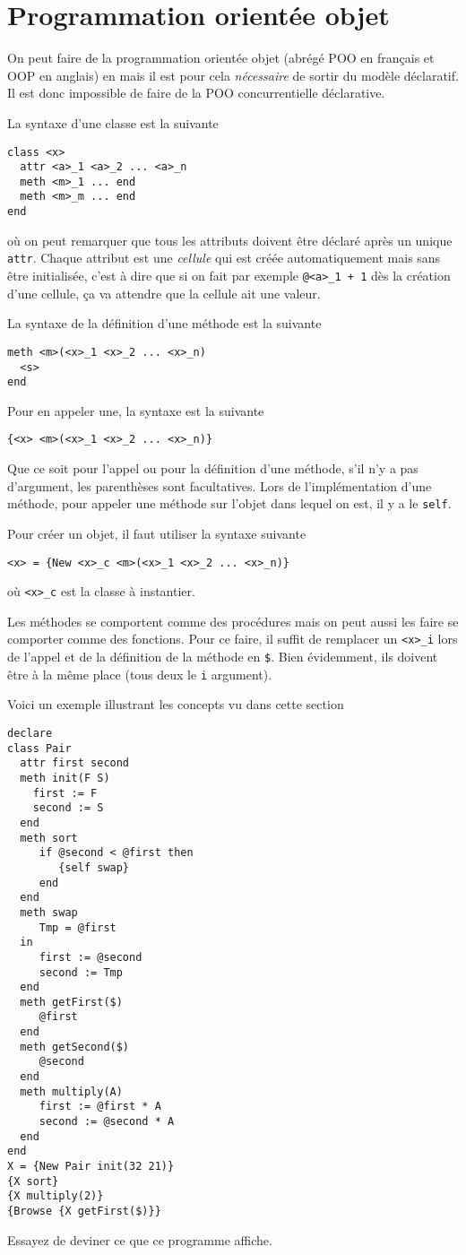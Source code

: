 \section{Programmation orientée objet}
On peut faire de la programmation orientée objet
(abrégé POO en français et OOP en anglais) en \oz{} mais il
est pour cela \emph{nécessaire} de sortir du modèle déclaratif.
Il est donc impossible de faire de la POO concurrentielle déclarative.

La syntaxe d'une classe est la suivante
\begin{lstlisting}
class <x>
  attr <a>_1 <a>_2 ... <a>_n
  meth <m>_1 ... end
  meth <m>_m ... end
end
\end{lstlisting}
où on peut remarquer que tous les attributs doivent être déclaré
après un unique \keyword{} \lstinline|attr|.
Chaque attribut est une \emph{cellule} qui est créée automatiquement
mais sans être initialisée, c'est à dire que si on fait par exemple
\lstinline|@<a>_1 + 1| dès la création d'une cellule, ça va attendre
que la cellule ait une valeur.

La syntaxe de la définition d'une méthode est la suivante
\begin{lstlisting}
meth <m>(<x>_1 <x>_2 ... <x>_n)
  <s>
end
\end{lstlisting}

Pour en appeler une, la syntaxe est la suivante
\begin{lstlisting}
{<x> <m>(<x>_1 <x>_2 ... <x>_n)}
\end{lstlisting}
Que ce soit pour l'appel ou pour la définition d'une méthode,
s'il n'y a pas d'argument, les parenthèses sont facultatives.
Lors de l'implémentation d'une méthode,
pour appeler une méthode sur l'objet dans lequel on est,
il y a le \keyword{} \lstinline|self|.

Pour créer un objet, il faut utiliser la syntaxe suivante
\begin{lstlisting}
<x> = {New <x>_c <m>(<x>_1 <x>_2 ... <x>_n)}
\end{lstlisting}
où \lstinline|<x>_c| est la classe à instantier.

Les méthodes se comportent comme des procédures mais on peut aussi les
faire se comporter comme des fonctions.
Pour ce faire, il suffit de remplacer un \lstinline|<x>_i| lors de l'appel
et de la définition de la méthode en \lstinline|$|.
Bien évidemment, ils doivent être à la même place
(tous deux le \lstinline|i|\ieme{} argument).

Voici un exemple illustrant les concepts vu dans cette section
\begin{lstlisting}
declare
class Pair
  attr first second
  meth init(F S)
    first := F
    second := S
  end
  meth sort
     if @second < @first then
        {self swap}
     end
  end
  meth swap
     Tmp = @first
  in
     first := @second
     second := Tmp
  end
  meth getFirst($)
     @first
  end
  meth getSecond($)
     @second
  end
  meth multiply(A)
     first := @first * A
     second := @second * A
  end
end
X = {New Pair init(32 21)}
{X sort}
{X multiply(2)}
{Browse {X getFirst($)}}
\end{lstlisting}
Essayez de deviner ce que ce programme affiche.

